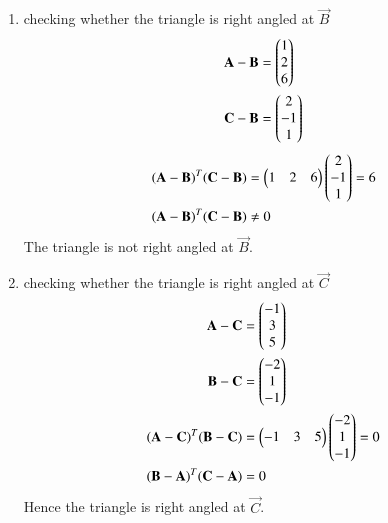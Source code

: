 \documentclass[journal,12pt,twocolumn]{IEEEtran}
\begin{document}
\begin{enumerate}
\begin{enumerate}
\item checking whether the triangle is right angled at $\vec{B}$
\begin{align}
\mathbf{A}-\mathbf{B} &= \begin{pmatrix}1\\2\\6\end{pmatrix} \\
\mathbf{C}-\mathbf{B} &= \begin{pmatrix}2\\-1\\1\end{pmatrix} 
\end{align}
\begin{align}
{(\mathbf{A}-\mathbf{B})}^{T}{(\mathbf{C}-\mathbf{B})} &= \begin{pmatrix}1&2&6\end{pmatrix}\begin{pmatrix}2\\-1\\1\end{pmatrix} = 6\\
{(\mathbf{A}-\mathbf{B})}^{T}{(\mathbf{C}-\mathbf{B})} &\neq 0
\end{align}
The triangle is not right angled at $\vec{B}$.\\

\item checking whether the triangle is right angled at $\vec{C}$
\begin{align}
\mathbf{A}-\mathbf{C} &= \begin{pmatrix}-1\\3\\5\end{pmatrix} \\
\mathbf{B}-\mathbf{C} &= \begin{pmatrix}-2\\1\\-1\end{pmatrix} \\
{(\mathbf{A}-\mathbf{C})}^{T}{(\mathbf{B}-\mathbf{C})} &= \begin{pmatrix}-1&3&5\end{pmatrix}\begin{pmatrix}-2\\1\\-1\end{pmatrix} = 0\\
{(\mathbf{B}-\mathbf{A})}^{T}{(\mathbf{C}-\mathbf{A})} &= 0
\end{align}
Hence the triangle is right angled at $\vec{C}$.
\end{enumerate}
\end{enumerate}
\end{document}
